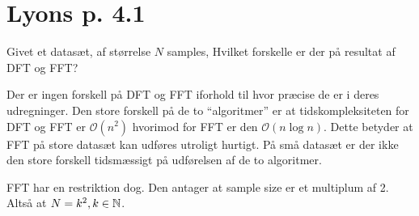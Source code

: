 \newpage

\section{Lyons p. 4.1}
Givet et datasæt, af størrelse $N$ samples, Hvilket forskelle er der på resultat af DFT og FFT?%

Der er ingen forskell på DFT og FFT iforhold til hvor præcise de er i deres udregninger.
Den store forskell på de to ``algoritmer'' er at tidskompleksiteten for DFT og FFT er 
$\mathcal{O}(n^{2})$ hvorimod for FFT er den $\mathcal{O}(n\log{n})$. Dette betyder at FFT
på store datasæt kan udføres utroligt hurtigt. På små datasæt er der ikke den store forskell
tidsmæssigt på udførelsen af de to algoritmer.

FFT har en restriktion dog. Den antager at sample size er et multiplum af 2. Altså at $N = k^{2}, k \in \mathbb{N}$.


